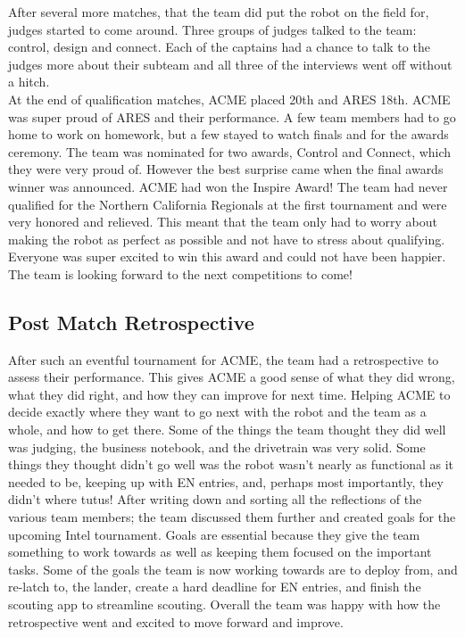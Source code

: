 \documentclass{article}
\begin{document}
After several more matches, that the team did put the robot on the field for, judges started to come around. Three groups of judges talked to the team: control, design and connect. Each of the captains had a chance to talk to the judges more about their subteam and all three of the interviews went off without a hitch. \\

At the end of qualification matches, ACME placed 20th and ARES 18th. ACME was super proud of ARES and their performance. A few team members had to go home to work on homework, but a few stayed to watch finals and for the awards ceremony. The team was nominated for two awards, Control and Connect, which they were very proud of. However the best surprise came when the final awards winner was announced. ACME had won the Inspire Award! The team had never qualified for the Northern California Regionals at the first tournament and were very honored and relieved. This meant that the team only had to worry about making the robot as perfect as possible and not have to stress about qualifying. Everyone was super excited to win this award and could not have been happier. The team is looking forward to the next competitions to come!\\

\subsection{Post Match Retrospective}
After such an eventful tournament for ACME, the team had a retrospective to assess their performance. This gives ACME a good sense of what they did wrong, what they did right, and how they can improve for next time. Helping ACME to decide exactly where they want to go next with the robot and the team as a whole, and how to get there. Some of the things the team thought they did well was judging, the business notebook, and the drivetrain was very solid. Some things they thought didn’t go well was the robot wasn’t nearly as functional as it needed to be, keeping up with EN entries, and, perhaps most importantly, they didn’t where tutus! After writing down and sorting all the reflections of the various team members; the team discussed them further and created goals for the upcoming Intel tournament. Goals are essential because they give the team something to work towards as well as keeping them focused on the important tasks. Some of the goals the team is now working towards are to deploy from, and re-latch to, the lander, create a hard deadline for EN entries, and finish the scouting app to streamline scouting. Overall the team was happy with how the retrospective went and excited to move forward and improve. 
\end{document}

